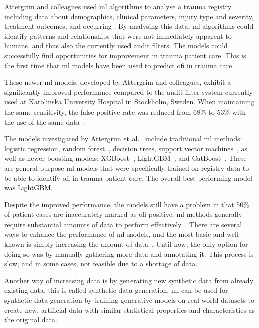 \documentclass[12pt, a4paper]{article}
\begin{document}
Attergrim and colleagues used \acrshort{ml} algorithms to analyse a trauma registry including data about demographics,
clinical parameters, injury type and severity, treatment outcomes, and occurring . By analysing this
data, \acrshort{ml} algorithms could identify patterns and relationships that were not immediately apparent to humans,
and thus also the currently used audit filters. The models could successfully find opportunities for improvement in
trauma patient care. This is the first time that \acrshort{ml} models have been used to predict \acrshort{ofi} in
trauma care.~\cite{attergrim_predicting_2023}

These newer \acrshort{ml} models, developed by Attergrim and colleagues, exhibit a significantly improved performance
compared to the audit filter system currently used at Karolinska University Hospital in Stockholm, Sweden. When
maintaining the same sensitivity, the false positive rate was reduced from 68\% to 53\% with the use of the same
data~\cite{attergrim_predicting_2023}.

The models investigated by Attergrim et al.~\cite{attergrim_predicting_2023} include traditional \acrshort{ml} methods:
logistic regression, random forest~\cite{breiman_random_2001}, decision trees, support vector
machines~\cite{cortes_support-vector_1995}, as well as newer boosting models: XGBoost~\cite{chen_xgboost_2016},
LightGBM~\cite{ke_lightgbm_2017}, and CatBoost~\cite{prokhorenkova_catboost_2018}. These are general purpose
\acrshort{ml} models that were specifically trained on registry data to be able to identify \acrshort{ofi} in trauma
patient care. The overall best performing model was LightGBM.

Despite the improved performance, the models still have a problem in that 50\% of patient cases are inaccurately marked
as \acrshort{ofi} positive. \acrshort{ml} methods generally require substantial amounts of data to perform
effectively~\cite{piccialli_survey_2021}. There are several ways to enhance the performance of \acrshort{ml} models,
and the most basic and well-known is simply increasing the amount of data~\cite{greener_guide_2022}. Until now, the
only option for doing so was by manually gathering more data and annotating it. This process is slow, and in some
cases, not feasible due to a shortage of data.

Another way of increasing data is by generating new synthetic data from already existing data, this is called synthetic
data generation. \acrshort{ml} can be used for synthetic data generation by training generative models on real-world
datasets to create new, artificial data with similar statistical properties and characteristics as the original
data.~\cite{chen_synthetic_2021}
\end{document}
